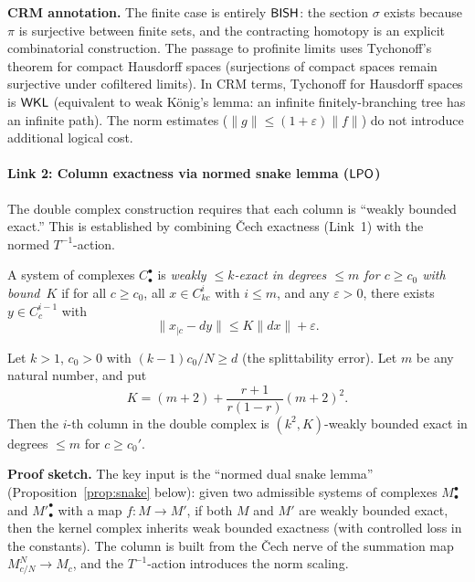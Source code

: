 \medskip
\noindent\textbf{CRM annotation.}
The finite case is entirely $\textsf{BISH}$: the section $\sigma$ exists
because $\pi$ is surjective between finite sets, and the contracting
homotopy is an explicit combinatorial construction.  The passage to
profinite limits uses Tychonoff's theorem for compact Hausdorff spaces
(surjections of compact spaces remain surjective under cofiltered
limits).  In CRM terms, Tychonoff for Hausdorff spaces is $\textsf{WKL}$
(equivalent to weak K\"onig's lemma: an infinite finitely-branching
tree has an infinite path).  The norm estimates ($\|g\| \leq
(1+\varepsilon)\|f\|$) do not introduce additional logical cost.

\paragraph{Link 2: Column exactness via normed snake lemma ($\textsf{LPO}$)}

The double complex construction requires that each column is
``weakly bounded exact.''  This is established by combining
\v{C}ech exactness (Link~1) with the normed $T^{-1}$-action.

\begin{definition}
\label{def:weak-exact}
A system of complexes $C_\bullet^\bullet$ is
\emph{weakly $\leq k$-exact in degrees $\leq m$ for $c \geq c_0$
with bound~$K$} if for all $c \geq c_0$, all $x \in C_{kc}^i$ with
$i \leq m$, and any $\varepsilon > 0$, there exists $y \in C_c^{i-1}$
with
\[
  \|x_{|c} - dy\| \leq K\|dx\| + \varepsilon.
\]
\end{definition}

\begin{proposition}
\label{prop:col-exact}
Let $k > 1$, $c_0 > 0$ with $(k-1)c_0/N \geq d$ (the splittability
error).  Let $m$ be any natural number, and put
\[
  K = (m+2) + \frac{r+1}{r(1-r)}(m+2)^2.
\]
Then the $i$-th column in the double complex is $(k^2, K)$-weakly
bounded exact in degrees $\leq m$ for $c \geq c_0'$.
\end{proposition}

\noindent\textbf{Proof sketch.}
The key input is the ``normed dual snake lemma''
(Proposition~\ref{prop:snake} below): given two admissible systems of
complexes $M_\bullet^\bullet$ and ${M'}_\bullet^\bullet$ with a map
$f: M \to M'$, if both $M$ and $M'$ are weakly bounded exact, then
the kernel complex inherits weak bounded exactness (with controlled
loss in the constants).  The column is built from the Čech nerve of
the summation map $M^N_{c/N} \to M_c$, and the $T^{-1}$-action
introduces the norm scaling.


